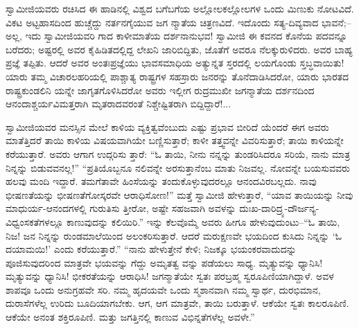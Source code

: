 ಸ್ವಾಮೀಜಿಯವರು ರಚಿಸಿದ ಈ ಹಾಡಿನಲ್ಲಿ ವಿಶ್ವದ ಬಗೆಬಗೆಯ ಅಲ್ಲೋಲಕಲ್ಲೋಲಗಳ ಒಂದು ಮಿಣುಕು ನೋಟವಿದೆ. ವಿಕಟ ಅಟ್ಟಹಾಸದಿಂದ ಹುಚ್ಚೆದ್ದು ನರ್ತನಗೈಯುವ ಜಗ ನ್ಮಾತೆಯ ಚಿತ್ರಣವಿದೆ. ಇದೊಂದು ಸತ್ಯ-ದಿವ್ಯವಾದ ಭಾವನೆ;–ಅಲ್ಲ, ಇದು ಸ್ವಾಮೀಜಿಯವರಿ ಗಾದ ಕಾಳೀಮಾತೆಯ ದರ್ಶನಾನುಭವ! ಸ್ವಾಮೀಜಿ ಈ ಕವನದ ಕೊನೆಯ ಪದವನ್ನೂ ಬರೆದರು; ಅಷ್ಟರಲ್ಲಿ ಅವರ ಕೈಹಿಡಿತದಲ್ಲಿದ್ದ ಲೇಖನಿ ಜಾರಿಬಿದ್ದಿತು, ಜೊತೆಗೆ ಅವರೂ ನೆಲಕ್ಕುರುಳಿದರು. ಅವರ ಬಾಹ್ಯ ಪ್ರಜ್ಞೆ ತಪ್ಪಿತು. ಆದರೆ ಅವರ ಅಂತಃಪ್ರಜ್ಞೆಯು ಭಾವಸಮಾಧಿಯ ಅತ್ಯುನ್ನತ ಸ್ತರದಲ್ಲಿ ಲಯಗೊಂಡು ಸ್ತಬ್ಧವಾಯಿತು! ಯಾರು ತಮ್ಮ ವಿಚಾರಲಹರಿಯಲ್ಲಿ ಪಾಶ್ಚಾತ್ಯ ರಾಷ್ಟ್ರಗಳ ಸಹಸ್ರಾರು ಜನರನ್ನು ತೊನೆದಾಡಿಸಿದರೋ, ಯಾರು ಭಾರತದ ರಾಷ್ಟ್ರಕುಂಡಲಿನಿ ಯನ್ನೇ ಜಾಗೃತಗೊಳಿಸಿದರೋ ಅವರು ಇಲ್ಲೀಗ ರುದ್ರಮುಖೀ ಜಗನ್ಮಾತೆಯ ದರ್ಶನದಿಂದ ಆನಂದಾಶ್ಚರ್ಯವಿಮತ್ತರಾಗಿ ಮೃತರಾದವರಂತೆ ನಿಶ್ಚೇಷ್ಟಿತರಾಗಿ ಬಿದ್ದಿದ್ದಾರೆ!...

ಸ್ವಾಮೀಜಿಯವರ ಮನಸ್ಸಿನ ಮೇಲೆ ಕಾಳಿಯ ವ್ಯಕ್ತಿತ್ವವೆಂಬುದು ಎಷ್ಟು ಪ್ರಭಾವ ಬೀರಿದೆ ಯೆಂದರೆ ಈಗ ಅವರು ಮಾತೆತ್ತಿದರೆ ತಾಯಿ ಕಾಳಿಯ ವಿಷಯವಾಗಿಯೇ ಬಣ್ಣಿಸುತ್ತಾರೆ; ಕಾಳೀ ತತ್ತ್ವವನ್ನೇ ವಿವರಿಸುತ್ತಾರೆ; ತಾಯಿ ಕಾಳಿಯನ್ನೇ ಕರೆಯುತ್ತಾರೆ. ಅವರು ಆಗಾಗ ಉದ್ಗರಿಸು ತ್ತಾರೆ: “ಓ ತಾಯಿ, ನೀನು ನನ್ನನ್ನು ತುಂಡರಿಸಿದರೂ ಸರಿಯೆ, ನಾನು ಮಾತ್ರ ನಿನ್ನನ್ನು ಬಿಡುವವನಲ್ಲ!” “ಪ್ರತಿಯೊಬ್ಬನೂ ನಲಿವನ್ನೇ ಅರಸುತ್ತಾನೆಂಬ ಮಾತು ನಿಜವಲ್ಲ. ನೋವನ್ನೇ ಬಯಸುವವರು ಹಲವು ಮಂದಿ ಇದ್ದಾರೆ. ತಮಗೆತಾವೇ ಹಿಂಸೆಯನ್ನು ತಂದುಕೊಳ್ಳುವುದರಲ್ಲೂ ಆನಂದವಿರಬಲ್ಲದು. ನಾವು ಭೀಷಣತೆಯನ್ನು ಭೀಷಣತೆಗೋಸ್ಕರವೇ ಆರಾಧಿಸೋಣ!” ಮತ್ತೆ ಸ್ವಾಮೀಜಿ ಹೇಳುತ್ತಾರೆ, “ಯಾವ ತಾಯಿಯನ್ನು ನೀವು ಮಾಧುರ್ಯ-ಆನಂದಗಳಲ್ಲಿ ಗುರುತಿಸು ತ್ತೀರೋ, ಅಷ್ಟೇ ಸಹಜವಾಗಿ ಅವಳನ್ನು ದುಃಖ-ದಾರಿದ್ರ್ಯ-ದೌರ್ಜನ್ಯ-ವಿಧ್ವಂಸಕತೆಗಳಲ್ಲೂ ಕಾಣುವುದನ್ನು ಕಲಿಯಿರಿ.” ಇನ್ನು ಕೆಲವೊಮ್ಮೆ ಅವರು ಹೀಗೂ ಹೇಳುವುದುಂಟು–“ಓ ತಾಯಿ, ನಿಜ! ಜನ ನಿನ್ನನ್ನು ರುಂಡಮಾಲೆಯಿಂದ ಅಲಂಕರಿಸುತ್ತಾರೆ. ಆದರೆ ಮರುಕ್ಷಣವೇ ಭಯದಿಂದ ಕುಸಿದು ನಿನ್ನನ್ನು ‘ಓ ದಯಾಮಯಿ!’ ಎಂದು ಕರೆಯುತ್ತಾರೆ.” “ನಾನು ಹೇಳುತ್ತೇನೆ ಕೇಳಿ; ನಿಜಕ್ಕೂ ಭಯಂಕರವಾದುದನ್ನು ಪೂಜಿಸುವುದರಿಂದ ಮಾತ್ರವೇ ಭಯವನ್ನು ಗೆದ್ದು ಅಮೃತತ್ವ ವನ್ನು ಪಡೆಯಲು ಸಾಧ್ಯ. ಮೃತ್ಯುವನ್ನು ಧ್ಯಾನಿಸಿ! ಮೃತ್ಯುವನ್ನು ಧ್ಯಾನಿಸಿ! ಭೀಕರತೆಯನ್ನು ಆರಾಧಿಸಿ! ಜಗನ್ಮಾತೆಯೇ ಸ್ವತಃ ಪರಬ್ರಹ್ಮ ಸ್ವರೂಪಿಣಿಯಾಗಿದ್ದಾಳೆ. ಅವಳ ಶಾಪವೂ ಒಂದು ಅನುಗ್ರಹವೇ ಸರಿ. ನಮ್ಮ ಹೃದಯವೇ ಒಂದು ಸ್ಮಶಾನವಾಗಿ ನಮ್ಮ ಸ್ವಾರ್ಥ, ದುರಭಿಮಾನ, ದುರಾಸೆಗಳೆಲ್ಲ ಉರಿದು ಬೂದಿಯಾಗಬೇಕು. ಆಗ, ಆಗ ಮಾತ್ರವೇ, ತಾಯಿ ಬರುತ್ತಾಳೆ. ಆಕೆಯೇ ಸ್ವತಃ ಕಾಲರೂಪಿಣಿ. ಆಕೆಯೇ ಅನಂತ ಶಕ್ತಿರೂಪಿಣಿ. ಮತ್ತು ಜಗತ್ತಿನಲ್ಲಿ ಕಾಣುವ ವಿಭಿನ್ನತೆಗಳೆಲ್ಲ ಅವಳೇ.”

